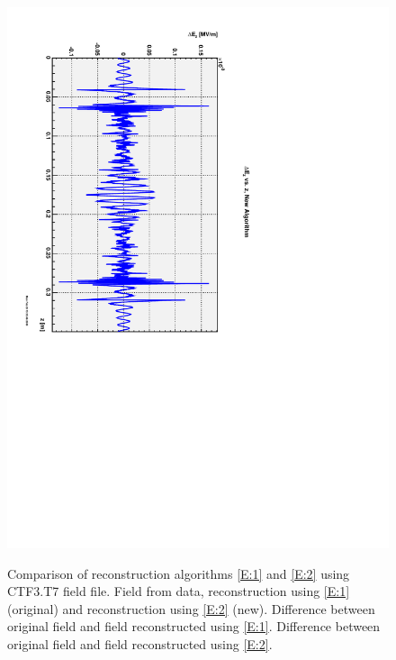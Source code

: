 \documentclass{report}
\begin{document}
\begin{figure}[hbt]
{    \includegraphics[scale=0.4,angle=90.0]{field-diff-new-CTF3.pdf}}
  \caption{Comparison of reconstruction algorithms \eqref{E:1} and \eqref{E:2} using CTF3.T7 field file. 
    Field from data, reconstruction using \eqref{E:1} (original) and reconstruction using \eqref{E:2} (new).
     Difference between original field and field reconstructed using \eqref{E:1}. 
    Difference between original field and field reconstructed using \eqref{E:2}.}
  \label{Fi:figure-1}
\end{figure}
\end{document}
